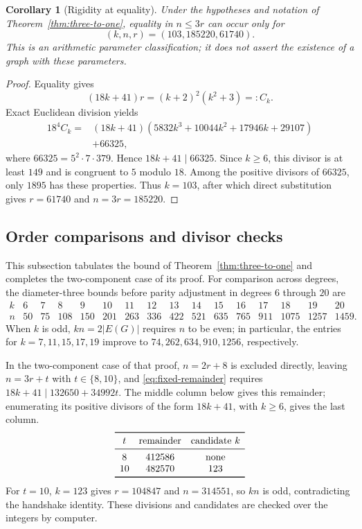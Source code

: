 \documentclass[a4paper,10pt,reqno]{amsart}
\theoremstyle{plain}
\newtheorem{corollary}[theorem]{Corollary}
\theoremstyle{definition}
\theoremstyle{remark}
\newcommand{\resultbox}[1]{\boxed{#1}}
\begin{document}
\begin{corollary}[Rigidity at equality]\label{cor:three-to-one-equality}
Under the hypotheses and notation of Theorem~\ref{thm:three-to-one}, equality
in \(n\le3r\) can occur only for
\[
 \resultbox{(k,n,r)=(103,185220,61740).}
\]
This is an arithmetic parameter classification; it does not assert the
existence of a graph with these parameters.
\end{corollary}

\begin{proof}
Equality gives
\[
 (18k+41)r=(k+2)^2(k^2+3)=:C_k.
\]
Exact Euclidean division yields
\[
\begin{aligned}
18^4C_k={}&(18k+41)
 (5832k^3+10044k^2+17946k+29107)\\
&+66325,
\end{aligned}
\]
where \(66325=5^2\cdot7\cdot379\).  Hence \(18k+41\mid66325\).
Since \(k\ge6\), this divisor is at least \(149\) and is congruent to \(5\)
modulo \(18\).  Among the positive divisors of \(66325\), only
\(1895\) has these properties.  Thus \(k=103\), after which direct
substitution gives \(r=61740\) and \(n=3r=185220\).
\end{proof}

\subsection{Order comparisons and divisor checks}
\label{app:three-to-one-arithmetic}

This subsection tabulates the bound of Theorem~\ref{thm:three-to-one} and
completes the two-component case of its proof.
For comparison across degrees, the diameter-three bounds before parity adjustment in degrees \(6\) through
\(20\) are
\[
\begin{array}{c|rrrrrrrrrrrrrrr}
 k&6&7&8&9&10&11&12&13&14&15&16&17&18&19&20\\
 \hline
 n&50&75&108&150&201&263&336&422&521&635&765&911&1075&1257&1459.
\end{array}
\]
When \(k\) is odd, \(kn=2|E(G)|\) requires \(n\) to be even; in particular,
the entries for \(k=7,11,15,17,19\) improve to
\(74,262,634,910,1256\), respectively.

In the two-component case of that proof, \(n=2r+8\) is excluded directly,
leaving \(n=3r+t\) with \(t\in\{8,10\}\), and \eqref{eq:fixed-remainder}
requires \(18k+41\mid132650+34992t\). The middle column below gives this
remainder; enumerating its positive divisors of the form \(18k+41\), with
\(k\ge6\), gives the last column.
\[
\begin{array}{ccc}
\toprule
t&\text{remainder}&\text{candidate }k\\
\midrule
8&412586&\text{none}\\
10&482570&123\\
\bottomrule
\end{array}
\]
For \(t=10\), \(k=123\) gives \(r=104847\) and \(n=314551\), so \(kn\) is
odd, contradicting the handshake identity. These divisions and candidates are
checked over the integers by computer.
\end{document}
